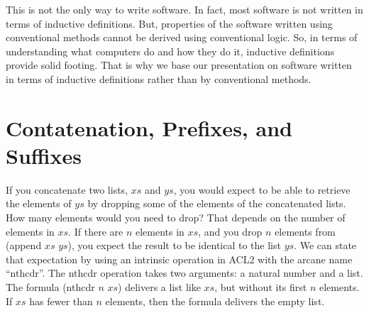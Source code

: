 This is not the only way to write software. In fact, most software is not written in terms of inductive definitions. But, properties of the software written using conventional methods cannot be derived using conventional logic. So, in terms of understanding what computers do and how they do it, inductive definitions provide solid footing. That is why we base our presentation on software written in terms of inductive definitions rather than by conventional methods.


\section{Contatenation, Prefixes, and Suffixes}
\label{sec:append-prefix-suffix}

If you concatenate two lists, $xs$ and $ys$, you would expect to be able to retrieve the elements of $ys$ by dropping some of the elements of the concatenated lists. How many elements would you need to drop? That depends on the number of elements in $xs$. If there are $n$ elements in $xs$, and you drop $n$ elements from (append $xs$ $ys$), you expect the result to be identical to the list $ys$. We can state that expectation by using an intrinsic operation in ACL2 with the arcane name ``nthcdr''. The nthcdr operation takes two arguments: a natural number and a list. The formula (nthcdr $n$ $xs$) delivers a list like $xs$, but without its first $n$ elements. If $xs$ has fewer than $n$ elements, then the formula delivers the empty list.

\begin{comment}
ACL2 can prove this theorem, but the proof requires knowing something about the algebra of numbers. Fortunately, someone has worked out a basic theory of numeric algebra in ACL2 terms, and we can take advantage of that by importing it into our working environment. To do this, we use a command called ``include-book''. The name of the ``book'' with the theory we need is ``arithmetic/top'', and it resides in the ``system'' directory of ACL2.

\begin{lstlisting}
(include-book "arithmetic/top" :dir :system)
(defthmd append-suffix-thm
  (equal (nthcdr (len xs) (append xs ys))
         ys))
\end{lstlisting}

Let's see how we could prove this theorem. We would need to know some properties of the nthcdr operation. The following are three properties that are so easily believable, we are going to take them as axioms. The symbol $n$ stands for a natural number in these axioms. They would not be true if $n$ were, say, $-1$.
\end{comment}

